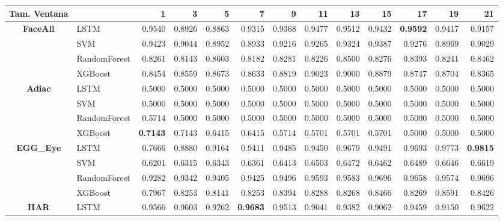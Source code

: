 \newpage

\begin{table}[h]
\centering
\begin{adjustbox}{max width=15cm}
\begin{tabular}{|c|l|r|r|r|r|r|r|r|r|r|r|r|}
	\hline
	\textbf{Tam. Ventana}&         &      1  &      3  &      5  &      7  &      9  &      11 &      13 &      15 &      17 &      19 &      21 \\
	\hline
	\textbf{FaceAll} & LSTM &  0.9540 &  0.8926 &  0.8863 &  0.9315 &  0.9368 &  0.9477 &  0.9512 &  0.9432 &  \textbf{0.9592} &  0.9417 &  0.9157 \\
	& SVM &  0.9423 &  0.9044 &  0.8952 &  0.8933 &  0.9216 &  0.9265 &  0.9324 &  0.9387 &  0.9276 &  0.8969 &  0.9029 \\
	& RandomForest &  0.8261 &  0.8143 &  0.8603 &  0.8182 &  0.8281 &  0.8226 &  0.8500 &  0.8276 &  0.8393 &  0.8241 &  0.8462 \\
	& XGBoost &  0.8454 &  0.8559 &  0.8673 &  0.8633 &  0.8819 &  0.9023 &  0.9000 &  0.8879 &  0.8747 &  0.8704 &  0.8365 \\
	\hline
	\textbf{Adiac} & LSTM &  0.5000 &  0.5000 &  0.5000 &  0.5000 &  0.5000 &  0.5000 &  0.5000 &  0.5000 &  0.5000 &  0.5000 &  0.5000 \\
	& SVM &  0.5000 &  0.5000 &  0.5000 &  0.5000 &  0.5000 &  0.5000 &  0.5000 &  0.5000 &  0.5000 &  0.5000 &  0.5000 \\
	& RandomForest &  0.5714 &  0.5000 &  0.5000 &  0.5000 &  0.5000 &  0.5000 &  0.5000 &  0.5000 &  0.5000 &  0.5000 &  0.5000 \\
	& XGBoost &  \textbf{0.7143} &  0.7143 &  0.6415 &  0.6415 &  0.5714 &  0.5701 &  0.5701 &  0.5701 &  0.5000 &  0.5000 &  0.5000 \\
	\hline
	\textbf{EGG\_Eye} & LSTM &  0.7666 &  0.8880 &  0.9164 &  0.9411 &  0.9485 &  0.9450 &  0.9679 &  0.9491 &  0.9693 &  0.9773 &  \textbf{0.9815} \\
	& SVM &  0.6201 &  0.6315 &  0.6343 &  0.6361 &  0.6413 &  0.6503 &  0.6472 &  0.6462 &  0.6489 &  0.6646 &  0.6619 \\
	& RandomForest &  0.9282 &  0.9342 &  0.9405 &  0.9425 &  0.9496 &  0.9593 &  0.9583 &  0.9696 &  0.9658 &  0.9574 &  0.9696 \\
	& XGBoost &  0.7967 &  0.8253 &  0.8141 &  0.8253 &  0.8394 &  0.8288 &  0.8268 &  0.8466 &  0.8269 &  0.8591 &  0.8426 \\
	\hline
	\textbf{HAR} & LSTM &  0.9566 &  0.9603 &  0.9262 &  \textbf{0.9683} &  0.9513 &  0.9641 &  0.9382 &  0.9062 &  0.9459 &  0.9150 &  0.9622 \\

\end{tabular}
\end{adjustbox}
\end{table}
